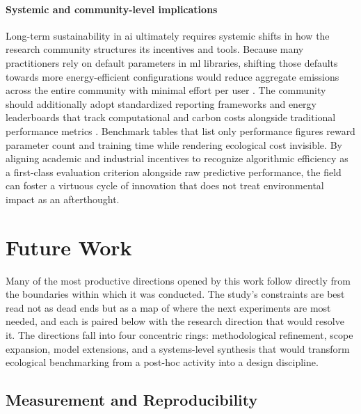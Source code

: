 \paragraph{Systemic and community-level implications}
Long-term sustainability in \gls{ai} ultimately requires systemic shifts in how the research community structures its incentives and tools. Because many practitioners rely on default parameters in \gls{ml} libraries, shifting those defaults towards more energy-efficient configurations would reduce aggregate emissions across the entire community with minimal effort per user \cite{hendersonSystematicReportingEnergy2020}. The community should additionally adopt standardized reporting frameworks and energy leaderboards that track computational and carbon costs alongside traditional performance metrics \cite{pattersonCarbonEmissionsLarge2021}. Benchmark tables that list only performance figures reward parameter count and training time while rendering ecological cost invisible. By aligning academic and industrial incentives to recognize algorithmic efficiency as a first-class evaluation criterion alongside raw predictive performance, the field can foster a virtuous cycle of innovation that does not treat environmental impact as an afterthought.



\section{Future Work}
\label{sec:future_work}

Many of the most productive directions opened by this work follow directly from the boundaries within which it was conducted. The study's constraints are best read not as dead ends but as a map of where the next experiments are most needed, and each is paired below with the research direction that would resolve it. The directions fall into four concentric rings: methodological refinement, scope expansion, model extensions, and a systems-level synthesis that would transform ecological benchmarking from a post-hoc activity into a design discipline.

\subsection{Measurement and Reproducibility}

